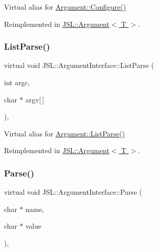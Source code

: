 Virtual alias for \hyperlink{classJSL_1_1Argument_aa626ff37dbebaf0501614dc625a76383}{Argument\+::\+Configure()} 



Reimplemented in \hyperlink{classJSL_1_1Argument_aa626ff37dbebaf0501614dc625a76383}{J\+S\+L\+::\+Argument$<$ T $>$}.

\mbox{\label{classJSL_1_1ArgumentInterface_a256b5bd88b5f6638353f108c48f3ee65}} 
\subsubsection{\texorpdfstring{List\+Parse()}{ListParse()}}
{\footnotesize\ttfamily virtual void J\+S\+L\+::\+Argument\+Interface\+::\+List\+Parse (\begin{DoxyParamCaption}\item[{int}]{argc,  }\item[{char $\ast$}]{argv\mbox{[}$\,$\mbox{]} }\end{DoxyParamCaption})\hspace{0.3cm}{\ttfamily [inline]}, {\ttfamily [virtual]}}



Virtual alias for \hyperlink{classJSL_1_1Argument_aa2b18bb35e90f91e224a06d60835053a}{Argument\+::\+List\+Parse()} 



Reimplemented in \hyperlink{classJSL_1_1Argument_aa2b18bb35e90f91e224a06d60835053a}{J\+S\+L\+::\+Argument$<$ T $>$}.

\mbox{\label{classJSL_1_1ArgumentInterface_a28b487f7a4fa6e721ed6629abe2073f2}} 
\subsubsection{\texorpdfstring{Parse()}{Parse()}}
{\footnotesize\ttfamily virtual void J\+S\+L\+::\+Argument\+Interface\+::\+Parse (\begin{DoxyParamCaption}\item[{char $\ast$}]{name,  }\item[{char $\ast$}]{value }\end{DoxyParamCaption})\hspace{0.3cm}{\ttfamily [inline]}, {\ttfamily [virtual]}}



